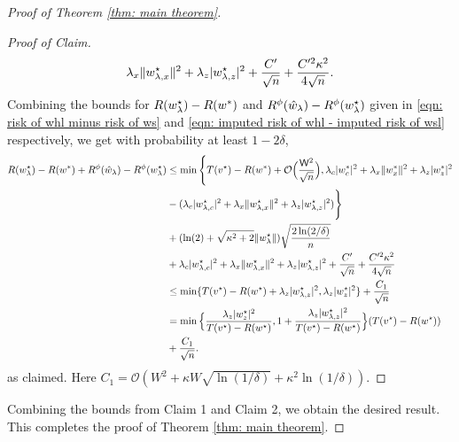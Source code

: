 \begin{proof}[Proof of Theorem \ref{thm: main theorem}]
\begin{proof}[Proof of Claim]
\begin{equation}
\begin{aligned}
                \lambda_x\|w^\star_{{\lambda,x}}\|^2 + \lambda_z|w^\star_{{\lambda,z}}|^2
                +  \frac{C'}{\sqrt{n}} +
                \frac{C'^2\kappa^2}{4\sqrt{n}}.
            \end{aligned}
        \end{equation}
Combining the bounds for $R(w^\star_{\lambda})-R(w^*)$ and $R^\phi(\hat{w}_\lambda)-R^\phi(w^\star_{\lambda})$ given in \eqref{eqn: risk of whl minus risk of ws} and \eqref{eqn: imputed risk of whl - imputed risk of wsl} respectively, we get with probability at least $1-2\delta$,
        \begin{equation*}
            \begin{aligned}
                R(w^\star_{\lambda})-R(w^*) + R^\phi(\hat{w}_\lambda) - R^\phi(w^\star_{\lambda}) &\leq
                \min\Bigg\{T(v^\star)-R(w^*) + \mathcal{O}\Big(\frac{\mathsf{W}^2}{\sqrt{n}}\Big), \lambda_c|w^*_{c}|^2 + \lambda_x\|w^*_{x}\|^2 + \lambda_z|w^*_{z}|^2 \\
                    &-(\lambda_c|w^\star_{{\lambda,c}}|^2 + \lambda_x\|w^\star_{{\lambda,x}}\|^2 + \lambda_z|w^\star_{{\lambda,z}}|^2)\Bigg\} \\
                    &+ (\ln(2) + \sqrt{\kappa^2+2}\|w^\star_{\lambda}\|)\sqrt{\frac{2\ln(2/\delta)}{n}} \\
                &+\lambda_c|w^\star_{{\lambda,c}}|^2 +
                \lambda_x\|w^\star_{{\lambda,x}}\|^2 + \lambda_z|w^\star_{{\lambda,z}}|^2
                +  \frac{C'}{\sqrt{n}} +
                \frac{C'^2\kappa^2}{4\sqrt{n}}\\
                &\leq  \min\{T(v^\star) - R(w^\star) + \lambda_z|w^\star_{{\lambda,z}}|^2,\lambda_z|w^\star_z|^2\} + \frac{C_1}{\sqrt{n}}\\
                &=\min\Big\{\frac{\lambda_z|w^\star_z|^2}{T(v^\star)-R(w^\star)},1+\frac{\lambda_z|w^\star_{{\lambda,z}}|^2}{T(v^\star)-R(w^\star)}\Big\}(T(v^\star)-R(w^\star)) \\
                &+ \frac{C_1}{\sqrt{n}}.
                \end{aligned}
        \end{equation*}
        as claimed. Here $C_1 = \mathcal{O}\left( W^2 + \kappa W \sqrt{\ln(1/\delta)} + \kappa^2 \ln(1/\delta) \right)$.
    \end{proof}

    Combining the bounds from Claim 1 and Claim 2, we obtain the desired result.
    This completes the proof of Theorem \ref{thm: main theorem}.
\end{proof}